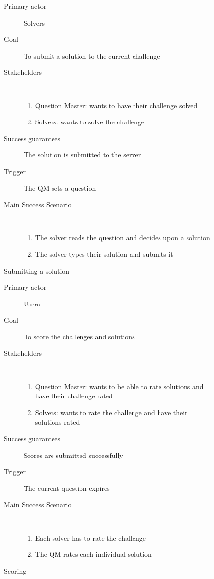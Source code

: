 \documentclass{report}
\begin{document}
{\begin{figure}[H]
\caption{Submitting a solution}
\begin{description}
\item[Primary actor] Solvers
\item[Goal] To submit a solution to the current challenge
\item[Stakeholders]~
\begin{enumerate}
\item Question Master: wants to have their challenge solved
\item Solvers: wants to solve the challenge
\end{enumerate}
\item[Success guarantees] The solution is submitted to the server
\item[Trigger] The QM sets a question
\item[Main Success Scenario]~
\begin{enumerate}
\item The solver reads the question and decides upon a solution
\item The solver types their solution and submits it
\end{enumerate}
\end{description}
\end{figure}

\begin{figure}[H]
\caption{Scoring}
\begin{description}
\item[Primary actor] Users
\item[Goal] To score the challenges and solutions
\item[Stakeholders]~
\begin{enumerate}
\item Question Master: wants to be able to rate solutions and have their challenge rated
\item Solvers: wants to rate the challenge and have their solutions rated
\end{enumerate}
\item[Success guarantees] Scores are submitted successfully
\item[Trigger] The current question expires
\item[Main Success Scenario]~
\begin{enumerate}
\item Each solver has to rate the challenge
\item The QM rates each individual solution
\end{enumerate}
\end{description}
\end{figure}
}
\end{document}
